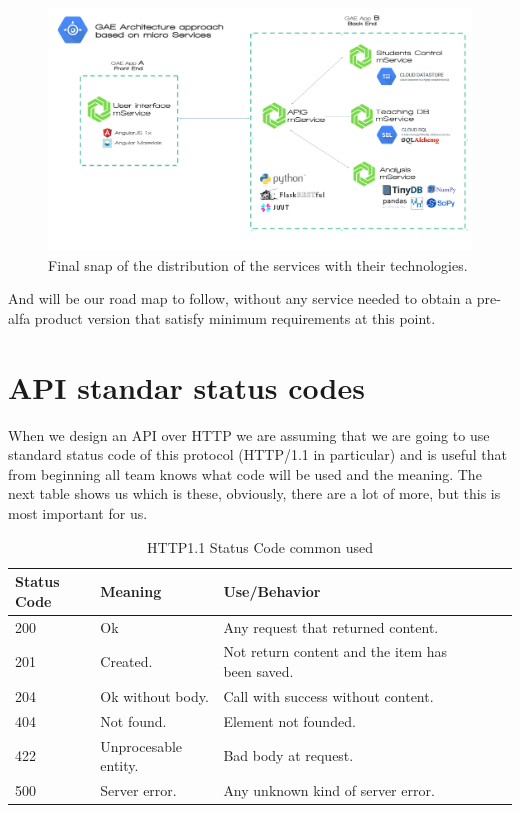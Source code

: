 \begin{figure}[H]
  \includegraphics[scale=0.15]{img/graphics/GAE_final_architecture.png}
  \centering
  \caption{Final snap of the distribution of the services with their technologies.}
\end{figure}

\noindent And will be our road map to follow, without any service needed to obtain a pre-alfa
product version that satisfy minimum requirements at this point.


\section{API standar status codes}

When we design an API over HTTP we are assuming that we are going to use standard
status code of this protocol (HTTP/1.1 in particular) and is useful that from beginning
all team knows what code will be used and the meaning. The next table shows us which is these,
obviously, there are a lot of more, but this is most important for us.

\begin{table}[H]
\centering

\begin{tabular}{@{}lllllll@{}}

Status Code & Meaning & Use/Behavior\\
\midrule

200 & Ok & Any request that returned content.\\
201 & Created. & Not return content and the item has been saved.\\
204 & Ok without body. & Call with success without content. \\
404 & Not found. & Element not founded.\\
422 & Unprocesable entity. & Bad body at request.\\
500 & Server error. & Any unknown kind of server error.\\

\end{tabular}
\caption{HTTP1.1 Status Code common used}
\label{my-label}
\end{table}

